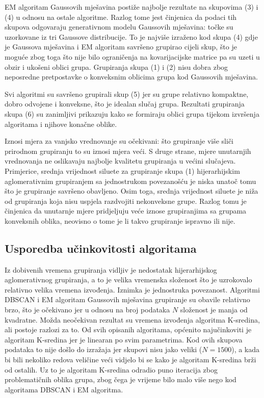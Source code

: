 \documentclass[times, utf8, zavrsni]{fer}
\begin{document}
EM algoritam Gaussovih mješavina postiže najbolje rezultate na skupovima (3) i (4) u odnosu na ostale algoritme. Razlog tome jest činjenica da podaci tih skupova odgovaraju generativnom modelu Gaussovih mješavina: točke su uzorkovane iz tri Gaussove distribucije. To je najviše izraženo kod skupa (4) gdje je Gaussova mješavina i EM algoritam savršeno grupirao cijeli skup, što je moguće zbog toga što nije bilo ograničenja na kovarijacijske matrice pa su uzeti u obzir i ukošeni oblici grupa. Grupiranja skupa (1) i (2) nisu dobra zbog neposredne pretpostavke o konveksnim oblicima grupa kod Gaussovih mješavina.

Svi algoritmi su savršeno grupirali skup (5) jer su grupe relativno kompaktne, dobro odvojene i konveksne, što je idealan slučaj grupa. Rezultati grupiranja skupa (6) su zanimljivi prikazuju kako se formiraju oblici grupa tijekom izvršenja algoritama i njihove konačne oblike.

Iznosi mjera za vanjsko vrednovanje su očekivani: što grupiranje više sliči prirodnom grupiranju to su iznosi mjera veći. S druge strane, mjere unutarnjih vrednovanja ne oslikavaju najbolje kvalitetu grupiranja u većini slučajeva. Primjerice, srednja vrijednost siluete za grupiranje skupa (1) hijerarhijskim aglomerativnim grupiranjem sa jednostrukom povezanošću je niska unatoč tomu što je grupiranje savršeno obavljeno. Osim toga, srednja vrijednost siluete je niža od grupiranja koja nisu uspjela razdvojiti nekonveksne grupe. Razlog tomu je činjenica da unutarnje mjere pridjeljuju veće iznose grupiranjima sa grupama konveksnih oblika, neovisno o tome je li takvo grupiranje ispravno ili nije.

\subsection{Usporedba učinkovitosti algoritama}

Iz dobivenih vremena grupiranja vidljiv je nedostatak hijerarhijskog aglomerativnog grupiranja, a to je velika vremenska složenost što je uzrokovalo relativno velika vremena izvođenja. Iznimka je jednostruka povezanost. Algoritmi DBSCAN i EM algoritam Gaussovih mješavina grupiranje su obavile relativno brzo, što je očekivano jer u odnosu na broj podataka $N$ složenost je manja od kvadratne. Možda neočekivan rezultat su vremena izvođenja algoritma K-sredina, ali postoje razlozi za to. Od svih opisanih algoritama, općenito najučinkoviti je algoritam K-sredina jer je linearan po svim parametrima. Kod ovih skupova podataka to nije došlo do izražaja jer skupovi nisu jako veliki ($N = 1500$), a kada bi bili nekoliko redova veličine veći vidjelo bi se kako je algoritam K-sredina brži od ostalih. Uz to je algoritam K-sredina odradio puno iteracija zbog problematičnih oblika grupa, zbog čega je vrijeme bilo malo više nego kod algoritama DBSCAN i EM algoritma.
\end{document}
